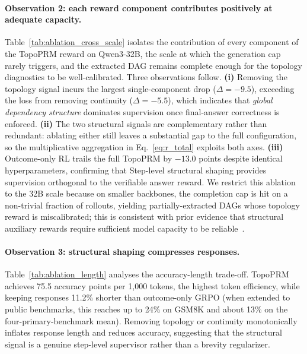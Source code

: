 

\paragraph{Observation 2: each reward component contributes positively at adequate capacity.}
Table~\ref{tab:ablation_cross_scale} isolates the contribution of every component of the TopoPRM reward on \mbox{Qwen3-32B}, the scale at which the generation cap rarely triggers, and the extracted DAG remains complete enough for the topology diagnostics to be well-calibrated. Three observations follow. \textbf{(i)} Removing the topology signal incurs the largest
single-component drop ($\Delta=-9.5$), exceeding the loss from removing continuity ($\Delta=-5.5$), which indicates that \emph{global dependency structure} dominates supervision once final-answer correctness is enforced.
\textbf{(ii)} The two structural signals are complementary rather than
redundant: ablating either still leaves a substantial gap to the full
configuration, so the multiplicative aggregation in Eq.~\ref{eq:r_total} exploits both axes. \textbf{(iii)} Outcome-only RL trails the full TopoPRM by $-13.0$ points despite identical hyperparameters, confirming that Step-level structural shaping provides supervision orthogonal to the verifiable answer reward. We restrict this ablation to the 32B scale because on smaller backbones, the completion cap is hit on a non-trivial fraction of rollouts, yielding partially-extracted DAGs whose topology reward is miscalibrated; this is consistent with prior evidence that structural
auxiliary rewards require sufficient model capacity to be
reliable~\citep{liu2026graph,yu2025dapo}.



\paragraph{Observation 3: structural shaping compresses responses.}
Table~\ref{tab:ablation_length} analyses the accuracy-length trade-off.
TopoPRM achieves 75.5 accuracy points per 1,000 tokens, the highest token efficiency, while keeping responses 11.2\% shorter than outcome-only GRPO (when extended to public benchmarks, this reaches up to 24\% on GSM8K and about 13\% on the four-primary-benchmark mean).
Removing topology or continuity monotonically inflates response length and reduces accuracy, suggesting that the structural signal is a genuine step-level supervisor rather than a brevity regularizer.

